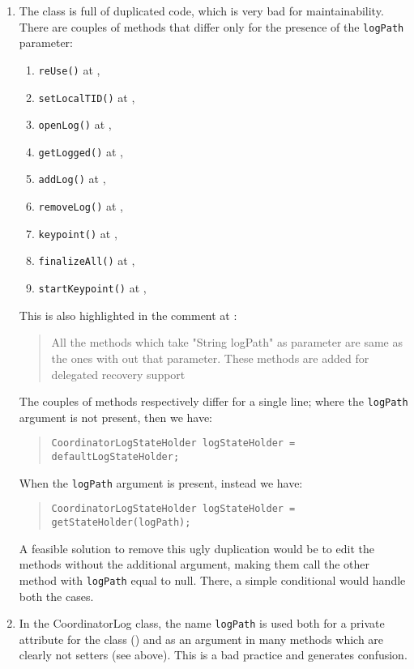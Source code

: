 \begin{enumerate}
    \item {} The class is full of duplicated code, which is very bad for maintainability. There are couples of methods that differ only for the presence of the \texttt{logPath} parameter:
    \begin{enumerate}
        \item \texttt{reUse()} at , 
    	\item \texttt{setLocalTID()} at , 
    	\item \texttt{openLog()} at , 
    	\item \texttt{getLogged()} at , 
    	\item \texttt{addLog()} at , 
    	\item \texttt{removeLog()} at , 
    	\item \texttt{keypoint()} at , 
    	\item \texttt{finalizeAll()} at , 
    	\item \texttt{startKeypoint()} at , 
    \end{enumerate}
    This is also highlighted in the comment at :
    \begin{quote}
        All the methods which take "String logPath" as parameter are same as the ones with out that parameter. These methods are added for delegated recovery support
    \end{quote}
    The couples of methods respectively differ for a single line; where the \texttt{logPath} argument is not present, then we have:
    \begin{quote}
        \small\texttt{CoordinatorLogStateHolder logStateHolder = defaultLogStateHolder;}
    \end{quote}
    When the \texttt{logPath} argument is present, instead we have:
    \begin{quote}
        \small\texttt{CoordinatorLogStateHolder logStateHolder = getStateHolder(logPath);}
    \end{quote}
    A feasible solution to remove this ugly duplication would be to edit the methods without the additional argument, making them call the other method with \texttt{logPath} equal to null. There, a simple conditional would handle both the cases.

    \item In the CoordinatorLog class, the name \texttt{logPath} is used both for a private attribute for the class () and as an argument in many methods which are clearly not setters (see above). This is a bad practice and generates confusion.
\end{enumerate}
